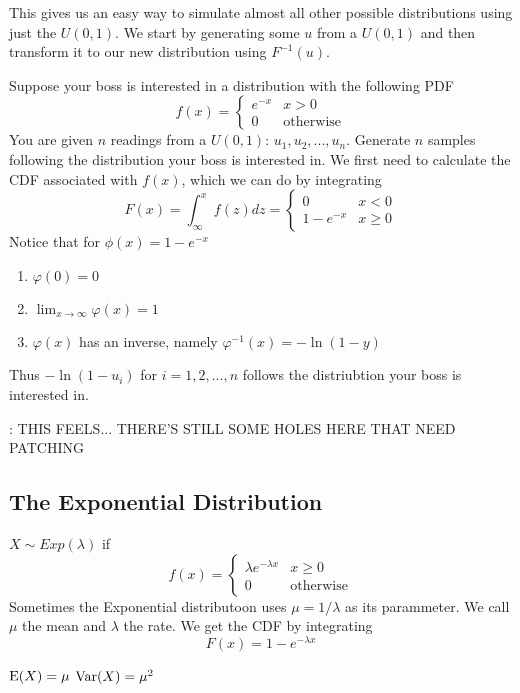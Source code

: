 \documentclass{report}
\begin{document}
This gives us an easy way to simulate almost all other possible distributions using just the $U(0,1)$. We start by generating some $u$ from a $U(0,1)$ and then transform it to our new distribution using $F^{-1}(u)$.
\begin{example}
    Suppose your boss is interested in a distribution with the following PDF
    \[
        f(x)=\begin{cases}
            e^{-x} & x> 0
            \\
            0 & \text{otherwise}
            \end{cases}
    \]
    You are given $n$ readings from a $U(0,1)$: $u_1, u_2,...,u_n$. Generate $n$ samples following the distribution your boss is interested in.
    \solution
    We first need to calculate the CDF associated with $f(x)$, which we can do by integrating
    \[
        F(x)=\int_{\infty}^x f(z)dz = \begin{cases}
            0 & x < 0
            \\
            1-e^{-x}& x\ge 0
        \end{cases}
    \]
    Notice that for $\phi(x)=1-e^{-x}$
    \begin{enumerate}
        \item $\varphi(0)=0$
        \item $\displaystyle\lim_{x\to\infty}\varphi(x)=1$
        \item $\varphi(x)$ has an inverse, namely $\varphi^{-1}(x)=-\ln(1-y)$
    \end{enumerate}
    Thus $-\ln(1-u_i)$ for $i=1,2,...,n$ follows the distriubtion your boss is interested in.
\end{example}
\todo: THIS FEELS... THERE'S STILL SOME HOLES HERE THAT NEED PATCHING

\subsection{The Exponential Distribution}
$X\sim Exp(\lambda)$ if
\[
    f(x)=\begin{cases}
        \lambda e^{-\lambda x} & x \ge 0
        \\
        0 & \text{otherwise}
    \end{cases}
\]
Sometimes the Exponential distributoon uses $\mu=1/\lambda $ as its parammeter. We call $\mu$ the mean and $\lambda $ the rate. We get the CDF by integrating
\[
    F(x)=1-e^{-\lambda x}
\]

$\textup{E}(X)=\mu$
$\textup{Var}(X)=\mu^2$
\end{document}
